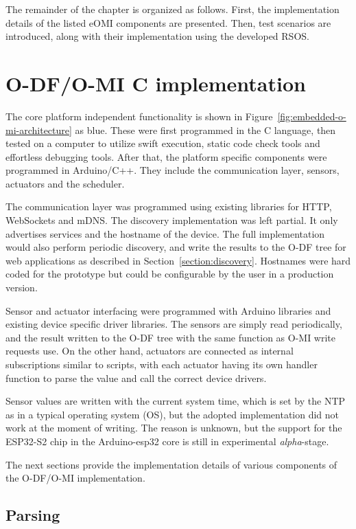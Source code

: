 The remainder of the chapter is organized as follows.
First, the implementation details of the listed eOMI components are presented. Then, test scenarios are introduced, along with their implementation using the developed RSOS.

\section{O-DF/O-MI C implementation}

The core platform independent functionality is shown in Figure~\ref{fig:embedded-o-mi-architecture} as blue. These were first programmed in the C language, then tested on a computer to utilize swift execution, static code check tools and effortless debugging tools. After that, the platform specific components were programmed in Arduino/C++. They include the communication layer, sensors, actuators and the scheduler.

The communication layer was programmed using existing libraries for HTTP, WebSockets and mDNS. The discovery implementation was left partial. It only advertises services and the hostname of the device. The full implementation would also perform periodic discovery, and write the results to the O-DF tree for web applications as described in Section~\ref{section:discovery}. Hostnames were hard coded for the prototype but could be configurable by the user in a production version.

Sensor and actuator interfacing were programmed with Arduino libraries and existing device specific driver libraries. The sensors are simply read periodically, and the result written to the O-DF tree with the same function as O-MI write requests use. On the other hand, actuators are connected as internal subscriptions similar to scripts, with each actuator having its own handler function to parse the value and call the correct device drivers.

Sensor values are written with the current system time, which is set by the NTP as in a typical operating system (OS), but the adopted implementation did not work at the moment of writing. The reason is unknown, but the support for the ESP32-S2 chip in the Arduino-esp32 core is still in experimental \emph{alpha}-stage.

The next sections provide the implementation details of various components of the O-DF/O-MI implementation.


\subsection{Parsing}\label{sec:Parsing}

